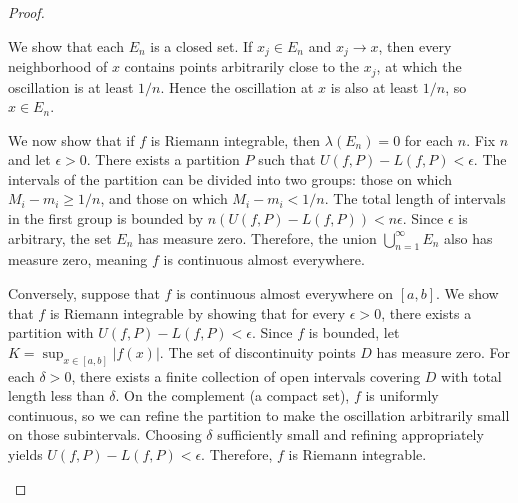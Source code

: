 \begin{proof}
\begin{enumerate}
    We show that each $E_n$ is a closed set. If $x_j \in E_n$ and $x_j \to x$, then every neighborhood of $x$ contains points arbitrarily close to the $x_j$, at which the oscillation is at least $1/n$. Hence the oscillation at $x$ is also at least $1/n$, so $x \in E_n$.

    We now show that if $f$ is Riemann integrable, then $\lambda(E_n) = 0$ for each $n$. Fix $n$ and let $\epsilon > 0$. There exists a partition $P$ such that $U(f,P) - L(f,P) < \epsilon$. The intervals of the partition can be divided into two groups: those on which $M_i - m_i \geq 1/n$, and those on which $M_i - m_i < 1/n$. The total length of intervals in the first group is bounded by $n(U(f,P) - L(f,P)) < n\epsilon$. Since $\epsilon$ is arbitrary, the set $E_n$ has measure zero. Therefore, the union $\bigcup_{n=1}^\infty E_n$ also has measure zero, meaning $f$ is continuous almost everywhere.

    Conversely, suppose that $f$ is continuous almost everywhere on $[a,b]$. We show that $f$ is Riemann integrable by showing that for every $\epsilon > 0$, there exists a partition with $U(f,P) - L(f,P) < \epsilon$. Since $f$ is bounded, let $K = \sup_{x \in [a,b]} |f(x)|$. The set of discontinuity points $D$ has measure zero. For each $\delta > 0$, there exists a finite collection of open intervals covering $D$ with total length less than $\delta$. On the complement (a compact set), $f$ is uniformly continuous, so we can refine the partition to make the oscillation arbitrarily small on those subintervals. Choosing $\delta$ sufficiently small and refining appropriately yields $U(f,P) - L(f,P) < \epsilon$. Therefore, $f$ is Riemann integrable.
\end{enumerate}
\end{proof}
